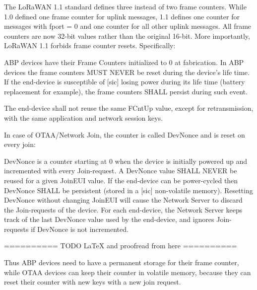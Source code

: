 {The LoRaWAN 1.1 standard defines three instead of two frame counters. While
1.0 defined one frame counter for uplink messages, 1.1 defines one
counter for messages with fport = 0 and one counter for all other uplink
messages. All frame counters are now 32-bit values rather than the original 16-bit. More importantly, LoRaWAN 1.1 forbids frame counter resets. Specifically:

\begin{displayquote}
ABP devices have their Frame Counters initialized to 0 at
fabrication. In ABP devices the frame counters MUST NEVER be reset during the device's life time. If
the end-device is susceptible of [sic] losing power during its life time (battery replacement
for example), the frame counters SHALL persist during such event.
\end{displayquote}

\begin{displayquote}
The end-device shall not reuse the same FCntUp value, except for
retransmission, with the same application and network session keys.
\end{displayquote}

In case of OTAA/Network Join, the counter is called DevNonce and is
reset on every join:


\begin{displayquote}
DevNonce is a counter starting at 0 when the device is initially
powered up and incremented with every Join-request. A DevNonce value SHALL NEVER be reused for a
given JoinEUI value. If the end-device can be power-cycled then DevNonce SHALL be
persistent (stored in a [sic] non-volatile memory). Resetting DevNonce without changing JoinEUI
will cause the Network Server to discard the Join-requests of the device. For each
end-device, the Network Server keeps track of the last DevNonce value used by the
end-device, and ignores Join-requests if DevNonce is not incremented.
\end{displayquote}

========== TODO \LaTeX{} and proofread from here ==========

{Thus ABP devices need to have a permanent storage for their frame
counter, while OTAA devices can keep their counter in volatile memory,
because they can reset their counter with new keys with a new join
request.}

}
